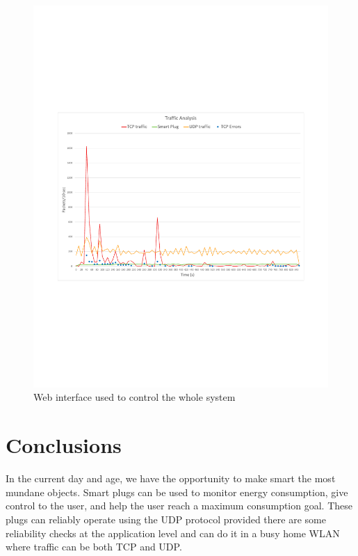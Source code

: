 \documentclass[conference]{IEEEtran}
\begin{document}
\begin{figure}[htbp]
	\centering
	\includegraphics[width=\linewidth]{assets/grafico}
	\caption{Web interface used to control the whole system}
	\label{fig:grafico}
\end{figure}


\section{Conclusions}
In the current day and age, we have the opportunity to make smart the most mundane objects. Smart plugs can be used to monitor energy consumption, give control to the user, and help the user reach a maximum consumption goal. These plugs can reliably operate using the UDP protocol provided there are some reliability checks at the application level and can do it in a busy home WLAN where traffic can be both TCP and UDP.

{}

	
\end{document}
